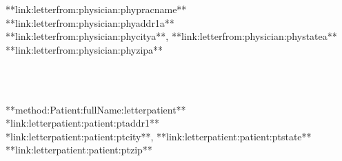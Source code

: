\documentclass{article}
\begin{document}
\begin{landscape}

\Large

\flushleft
\leftskip=3.2in {**link:letterfrom:physician:phypracname**} \\
\leftskip=3.2in **link:letterfrom:physician:phyaddr1a** \\
\leftskip=3.2in **link:letterfrom:physician:phycitya**, **link:letterfrom:physician:phystatea** **link:letterfrom:physician:phyzipa**

\bigskip
\ \\
\bigskip
\ \\
\bigskip

\leftskip=6.5in \Large {**method:Patient:fullName:letterpatient**} \\
\leftskip=6.5in \Large **link:letterpatient:patient:ptaddr1** \\
\leftskip=6.5in \Large **link:letterpatient:patient:ptcity**, **link:letterpatient:patient:ptstate** **link:letterpatient:patient:ptzip**

\end{landscape}
\end{document}
